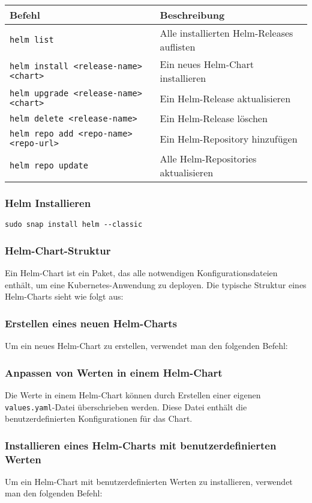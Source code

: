 \noindent
\begin{tabular}{
|p{}|p{}|}
\hline
\textbf{Befehl} & \textbf{Beschreibung} \\
\hline
\texttt{helm list} & Alle installierten Helm-Releases auflisten \\
\texttt{helm install <release-name> <chart>} & Ein neues Helm-Chart installieren \\
\texttt{helm upgrade <release-name> <chart>} & Ein Helm-Release aktualisieren \\
\texttt{helm delete <release-name>} & Ein Helm-Release löschen \\
\texttt{helm repo add <repo-name> <repo-url>} & Ein Helm-Repository hinzufügen \\
\texttt{helm repo update} & Alle Helm-Repositories aktualisieren \\
\hline
\end{tabular}
\subsubsection{Helm Installieren}
\texttt{sudo snap install helm {-}{-}classic}

\subsubsection{Helm-Chart-Struktur}
Ein Helm-Chart ist ein Paket, das alle notwendigen Konfigurationsdateien enthält, um eine Kubernetes-Anwendung zu deployen. Die typische Struktur eines Helm-Charts sieht wie folgt aus:


\subsubsection{Erstellen eines neuen Helm-Charts}
Um ein neues Helm-Chart zu erstellen, verwendet man den folgenden Befehl:


\subsubsection{Anpassen von Werten in einem Helm-Chart}
Die Werte in einem Helm-Chart können durch Erstellen einer eigenen \texttt{values.yaml}-Datei überschrieben werden. Diese Datei enthält die benutzerdefinierten Konfigurationen für das Chart.


\subsubsection{Installieren eines Helm-Charts mit benutzerdefinierten Werten}
Um ein Helm-Chart mit benutzerdefinierten Werten zu installieren, verwendet man den folgenden Befehl:

\newpage
